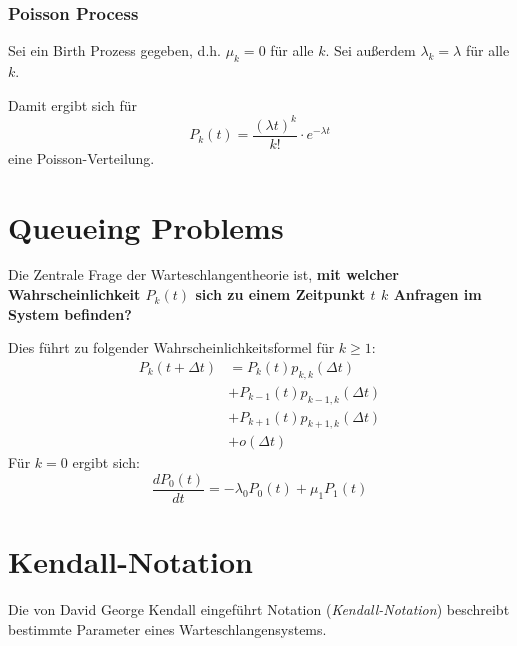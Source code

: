 \documentclass[a4paper, 11pt, accentcolor = tud3b]{tudreport}
\begin{document}
				\subsubsection{Poisson Process} %
					Sei ein Birth Prozess gegeben, d.h. \( \mu _ k = 0 \) für alle \(k\). Sei außerdem \( \lambda _ k = \lambda \) für alle \(k\).
					
					Damit ergibt sich für \[ P _ k (t) = \frac{(\lambda t ) ^ k}{k!} \cdot e ^ { -\lambda t } \] eine Poisson-Verteilung.
		
		\section{Queueing Problems}
			Die Zentrale Frage der Warteschlangentheorie ist, \textbf{mit welcher Wahrscheinlichkeit \(P_k(t)\) sich zu einem Zeitpunkt \(t\) \(k\) Anfragen im System befinden?}
			
			Dies führt zu folgender Wahrscheinlichkeitsformel für \(k \geq 1\):
			\begin{align*}
				P _ k (t + \Delta t) & = P _ k (t) p _ {k, k} (\Delta t)           \\
				                     & + P _ {k - 1} (t) p _ {k - 1, k} (\Delta t) \\
				                     & + P _ {k + 1} (t) p _ {k + 1, k} (\Delta t) \\
				                     & + o(\Delta t)
			\end{align*}
			Für \(k = 0\) ergibt sich:
			\begin{equation*}
				\frac{d P _ 0 (t)}{dt} = -\lambda _ 0 P _ 0 (t) + \mu _ 1 P _ 1 (t)
			\end{equation*}
		
		\section{Kendall-Notation}
			Die von David George Kendall eingeführt Notation (\textit{Kendall-Notation}) beschreibt bestimmte Parameter eines Warteschlangensystems.
			
\end{document}
